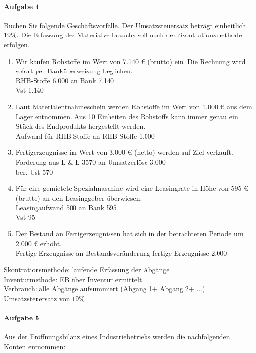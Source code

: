 \documentclass[paper=a4, fontsize=11pt]{scrartcl}
\numberwithin{equation}{section}
\numberwithin{figure}{section}
\numberwithin{table}{section}
\begin{document}
\paragraph{Aufgabe 4}
Buchen Sie folgende Geschäftsvorfälle. Der Umsatzsteuersatz beträgt einheitlich $19 \%$. Die Erfassung des Materialverbrauchs soll nach der Skontrationsmethode erfolgen. \\
\begin{enumerate}
\item Wir kaufen Rohstoffe im Wert von 7.140 € (brutto) ein. Die Rechnung wird sofort per Banküberweisung beglichen.  \\

RHB-Stoffe 6.000 an Bank 7.140 \\
Vst 1.140
\item Laut Materialentnahmeschein werden Rohstoffe im Wert von 1.000 € aus dem Lager entnommen. Aus 10 Einheiten des Rohstoffs kann immer genau ein Stück des Endprodukts hergestellt werden. \\
Aufwand für RHB Stoffe an RHB Stoffe 1.000 
\item Fertigerzeugnisse im Wert von 3.000 € (netto) werden auf Ziel verkauft. \\
Forderung aus L \& L 3570 an Umsatzerlöse 3.000 \\
ber. Ust 570 
\item Für eine gemietete Spezialmaschine wird eine Leasingrate in Höhe von 595 € (brutto) an den Leasinggeber überwiesen. \\
Leasingaufwand 500 an Bank 595 \\
Vst 95
\item Der Bestand an Fertigerzeugnissen hat sich in der betrachteten Periode um 2.000 € erhöht. \\
Fertige Erzeugnisse an Bestandsveränderung fertige Erzeugnisse 2.000
\end{enumerate}

Skontrationsmethode: laufende Erfassung der Abgänge \\
Inventurmethode: EB über Inventur ermittelt \\
Verbrauch: alle Abgänge aufsummiert (Abgang 1+ Abgang 2+ ...) \\
Umsatzsteuersatz von $19 \%$
\paragraph{Aufgabe 5}
Aus der Eröffnungsbilanz eines Industriebetriebs werden die nachfolgenden Konten entnommen:  \\
\end{document}
